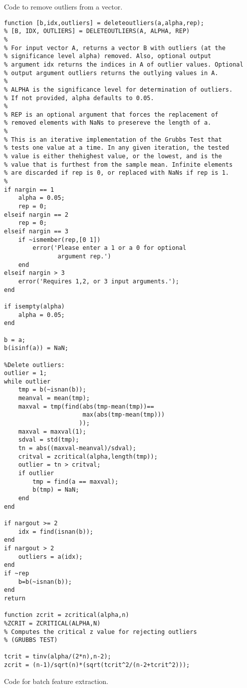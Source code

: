 \clearpage

Code to remove outliers from a vector.

\begin{verbatim}
function [b,idx,outliers] = deleteoutliers(a,alpha,rep);
% [B, IDX, OUTLIERS] = DELETEOUTLIERS(A, ALPHA, REP)
% 
% For input vector A, returns a vector B with outliers (at the
% significance level alpha) removed. Also, optional output 
% argument idx returns the indices in A of outlier values. Optional
% output argument outliers returns the outlying values in A.
%
% ALPHA is the significance level for determination of outliers.
% If not provided, alpha defaults to 0.05.
% 
% REP is an optional argument that forces the replacement of
% removed elements with NaNs to presereve the length of a.
%
% This is an iterative implementation of the Grubbs Test that
% tests one value at a time. In any given iteration, the tested 
% value is either thehighest value, or the lowest, and is the
% value that is furthest from the sample mean. Infinite elements
% are discarded if rep is 0, or replaced with NaNs if rep is 1.
% 
if nargin == 1
	alpha = 0.05;
	rep = 0;
elseif nargin == 2
	rep = 0;
elseif nargin == 3
	if ~ismember(rep,[0 1])
		error('Please enter a 1 or a 0 for optional
		       argument rep.')
	end
elseif nargin > 3
	error('Requires 1,2, or 3 input arguments.');
end

if isempty(alpha)
	alpha = 0.05;
end

b = a;
b(isinf(a)) = NaN;

%Delete outliers:
outlier = 1;
while outlier
	tmp = b(~isnan(b));
	meanval = mean(tmp);
	maxval = tmp(find(abs(tmp-mean(tmp))==
				      max(abs(tmp-mean(tmp)))
				     ));
	maxval = maxval(1);
	sdval = std(tmp);
	tn = abs((maxval-meanval)/sdval);
	critval = zcritical(alpha,length(tmp));
	outlier = tn > critval;
	if outlier
		tmp = find(a == maxval);
		b(tmp) = NaN;
	end
end

if nargout >= 2
	idx = find(isnan(b));
end
if nargout > 2
	outliers = a(idx);
end
if ~rep
	b=b(~isnan(b));
end
return

function zcrit = zcritical(alpha,n)
%ZCRIT = ZCRITICAL(ALPHA,N)
% Computes the critical z value for rejecting outliers
% (GRUBBS TEST)

tcrit = tinv(alpha/(2*n),n-2);
zcrit = (n-1)/sqrt(n)*(sqrt(tcrit^2/(n-2+tcrit^2)));
\end{verbatim}
\clearpage

Code for batch feature extraction.

